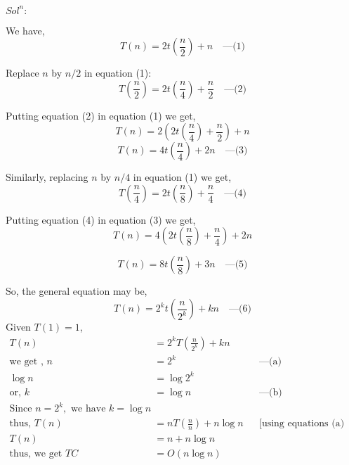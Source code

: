 \documentclass{article}
\begin{document}
$Sol^n:$

We have,
\begin{equation}
    T(n) = 2t\left(\frac{n}{2}\right) + n \quad \text{---(1)}
\end{equation}

Replace \( n \) by \( n/2 \) in equation (1):
\begin{equation}
    T\left(\frac{n}{2}\right) = 2t\left(\frac{n}{4}\right) + \frac{n}{2} \quad \text{---(2)}
\end{equation}

Putting equation (2) in equation (1) we get,
\begin{equation}
    T(n) = 2\left(2t\left(\frac{n}{4}\right) + \frac{n}{2}\right) + n
\end{equation}
\begin{equation}
    T(n) = 4t\left(\frac{n}{4}\right) + 2n \quad \text{---(3)}
\end{equation}

Similarly, replacing \( n \) by \( n/4 \) in equation (1) we get,
\begin{equation}
    T\left(\frac{n}{4}\right) = 2t\left(\frac{n}{8}\right) + \frac{n}{4} \quad \text{---(4)}
\end{equation}

Putting equation (4) in equation (3) we get,
\begin{equation}
T(n) = 4(2t\left(\frac{n}{8}\right) + \frac{n}{4}) + 2n
\end{equation}

\begin{equation}
    T(n) = 8t\left(\frac{n}{8}\right) + 3n \quad \text{---(5)}
\end{equation}


So, the general equation may be,
\begin{equation}
    T(n) = 2^k t\left(\frac{n}{2^k}\right) + kn \quad \text{---(6)}
\end{equation}
Given \( T(1) = 1 \),
\begin{align*}
    T(n) & = 2^k T\left(\frac{n}{2^k}\right) + kn \\\text{we get , }
    n & = 2^k && \text{---(a)} \\
    \log n & = \log 2^k \\
    \text{or, } k & = \log n && \text{---(b)} \\
    \text{Since } n = 2^k, \text{ we have } k = \log n \\
    \text{thus, } T(n) & = nT\left(\frac{n}{n}\right) + n \log n && \text{[using equations (a) and (b)]} \\
    T(n) & = n + n\log n\\
\text{thus, we get }    TC &= O(n \log n)
\end{align*}
\hrulefill
\newpage
\end{document}
